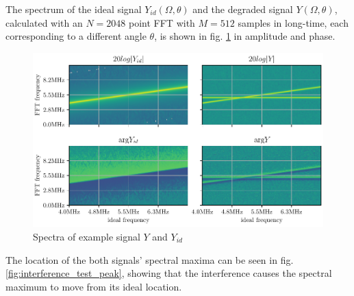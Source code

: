 The spectrum of the ideal signal $Y_{id}(\Omega, \theta)$ and the degraded signal $Y(\Omega,\theta)$,
calculated with an $N=2048$ point FFT with $M=512$ samples in long-time, each corresponding to a different angle $\theta$,
is shown in fig. \ref{fig:interference_test_spectrum} in amplitude and phase.
\begin{figure}[h]
  \centering
  \includegraphics[width=\textwidth]{../figures/interference_test_fft.pdf}
  \caption{Spectra of example signal $Y$ and $Y_{id}$}
  \label{fig:interference_test_spectrum}
\end{figure}
The location of the both signals' spectral maxima can be seen in fig. \ref{fig:interference_test_peak},
showing that the interference causes the spectral maximum to move from its ideal location. \\
